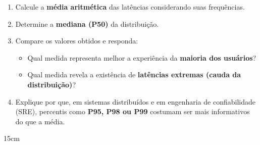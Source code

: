 \documentclass[12pt]{article}
\begin{document}
\begin{enumerate}[label=\alph*)]

\item Calcule a \textbf{média aritmética} das latências considerando suas frequências.

\item Determine a \textbf{mediana (P50)} da distribuição.

\item Compare os valores obtidos e responda:

\begin{itemize}
\item Qual medida representa melhor a experiência da \textbf{maioria dos usuários}?
\item Qual medida revela a existência de \textbf{latências extremas (cauda da distribuição)}?
\end{itemize}

\item Explique por que, em sistemas distribuídos e em engenharia de confiabilidade (SRE), percentis como \textbf{P95, P98 ou P99} costumam ser mais informativos do que a média.

\end{enumerate}

\begin{resposta}{15cm}
\end{resposta}
\end{document}
